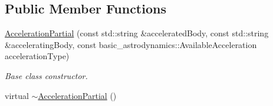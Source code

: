 \subsection*{Public Member Functions}
\begin{DoxyCompactItemize}
\item 
\hyperlink{classtudat_1_1acceleration__partials_1_1AccelerationPartial_ad4f4594c6e13138a1895dd008a14bf7e}{Acceleration\+Partial} (const std\+::string \&accelerated\+Body, const std\+::string \&accelerating\+Body, const basic\+\_\+astrodynamics\+::\+Available\+Acceleration acceleration\+Type)
\begin{DoxyCompactList}\small\item\em Base class constructor. \end{DoxyCompactList}\item 
virtual \hyperlink{classtudat_1_1acceleration__partials_1_1AccelerationPartial_ab373fff70206231b312a988e59902038}{$\sim$\+Acceleration\+Partial} ()\hypertarget{classtudat_1_1acceleration__partials_1_1AccelerationPartial_ab373fff70206231b312a988e59902038}{}\label{classtudat_1_1acceleration__partials_1_1AccelerationPartial_ab373fff70206231b312a988e59902038}


\end{DoxyCompactItemize}
